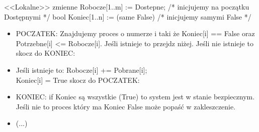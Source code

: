 \documentclass{beamer}
\begin{document}
\begin{frame}
  \begin{block}{<<Lokalne>> zmienne}
    Robocze[1..m] := Dostepne; /* inicjujemy na początku Dostępnymi */
    bool Koniec[1..n] := (same False) /* inicjujemy samymi False */
  \end{block}

  \begin{itemize}
  \item<1->
    POCZATEK:
    Znajdujemy proces o numerze i taki że Koniec[i] == False
    oraz Potrzebne[i] <= Robocze[i]. Jeśli istnieje to przejdz niżej.
    Jeśli nie istnieje to skocz do KONIEC:
  \item<2->
    Jeśli istnieje to:
    Robocze[i] += Pobrane[i];\\
    Koniec[i] = True
    skocz do POCZATEK:
  \item<3->
    KONIEC: if Koniec są wszystkie (True) to system jest w stanie
    bezpiecznym. Jeśli nie to proces który ma Koniec False
    może popaść w zakleszczenie.
  \item<4->
    (...)    
    \end{itemize}
\end{frame}
\end{document}
